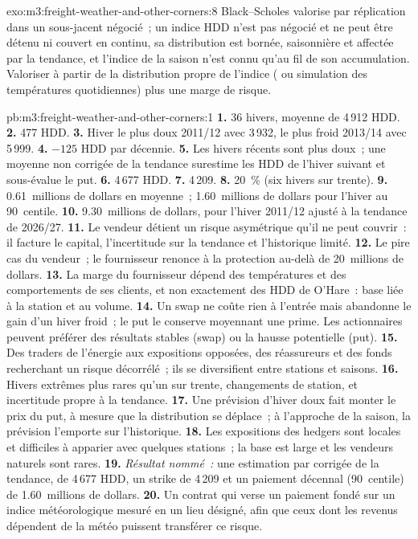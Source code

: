\begin{solution}{exo:m3:freight-weather-and-other-corners:8}
Black--Scholes valorise par réplication dans un sous-jacent négocié~; un indice HDD n'est pas négocié et ne peut
être détenu ni couvert en continu, sa distribution est bornée, saisonnière et affectée par la tendance, et l'indice
de la saison n'est connu qu'au fil de son accumulation. Valoriser à partir de la distribution propre de l'indice ( ou simulation des
températures quotidiennes) plus une marge de risque.
\end{solution}

\begin{solution}{pb:m3:freight-weather-and-other-corners:1}
\textbf{1.} 36 hivers, moyenne de 4\,912 HDD. \textbf{2.} 477 HDD. \textbf{3.} Hiver le plus doux 2011/12 avec 3\,932,
le plus froid 2013/14 avec 5\,999. \textbf{4.} $-125$ HDD par décennie. \textbf{5.} Les hivers récents sont plus doux~; une
moyenne non corrigée de la tendance surestime les HDD de l'hiver suivant et sous-évalue le put. \textbf{6.} 4\,677 HDD.
\textbf{7.} 4\,209. \textbf{8.} 20~\% (six hivers sur trente). \textbf{9.} 0.61~millions de dollars en moyenne~;
1.60~millions de dollars pour l'hiver au 90~centile. \textbf{10.} 9.30~millions de dollars, pour l'hiver 2011/12 ajusté à
la tendance de 2026/27. \textbf{11.} Le vendeur détient un risque asymétrique qu'il ne peut couvrir~: il facture le capital,
l'incertitude sur la tendance et l'historique limité. \textbf{12.} Le pire cas du vendeur~; le fournisseur renonce
à la protection au-delà de 20~millions de dollars. \textbf{13.} La marge du fournisseur dépend des températures et des
comportements de ses clients, et non exactement des HDD de O'Hare~: base liée à la station et au volume. \textbf{14.} Un swap ne coûte rien à l'entrée mais abandonne
le gain d'un hiver froid~; le put le conserve moyennant une prime. Les actionnaires peuvent préférer des résultats stables (swap) ou
la hausse potentielle (put). \textbf{15.} Des traders de l'énergie aux expositions opposées, des réassureurs et des fonds recherchant un risque décorrélé~;
ils se diversifient entre stations et saisons. \textbf{16.} Hivers extrêmes plus rares qu'un sur trente, changements
de station, et incertitude propre à la tendance. \textbf{17.} Une prévision d'hiver doux fait monter le prix du put, à mesure que la
distribution se déplace~; à l'approche de la saison, la prévision l'emporte sur l'historique. \textbf{18.} Les expositions des hedgers sont
locales et difficiles à apparier avec quelques stations~; la base est large et les vendeurs naturels sont rares.
\textbf{19.} \emph{Résultat nommé~:} une estimation par  corrigée de la tendance, de 4\,677 HDD, un strike de 4\,209 et un
paiement décennal (90~centile) de 1.60~millions de dollars. \textbf{20.} Un contrat qui verse un paiement fondé sur un indice
météorologique mesuré en un lieu désigné, afin que ceux dont les revenus dépendent de la météo puissent transférer ce risque.
\end{solution}

